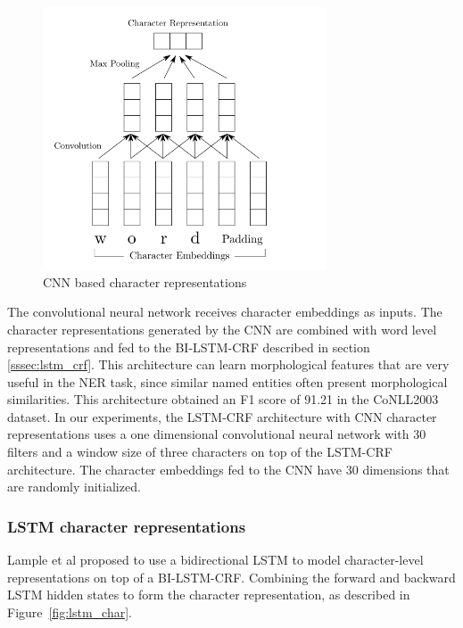 \documentclass{nle}
\begin{document}
\begin{figure}[h]
  \centering
	  \includegraphics[width=0.75\textwidth]{pics/cnn}
  \caption{CNN based character representations}
  \label{fig:cnn}
\end{figure}

The convolutional neural network receives character embeddings as inputs. The character 
representations generated by the CNN are combined with word level representations 
and fed to the BI-LSTM-CRF described in section \ref{sssec:lstm_crf}.
This architecture can learn morphological features that are very
useful in the NER task, since similar named entities often present morphological similarities. 
This architecture obtained an F1 score of 91.21 in the CoNLL2003 dataset. In our experiments, 
the LSTM-CRF architecture with CNN character representations uses a one dimensional convolutional 
neural network with 30 filters and a window size of three characters on top of the LSTM-CRF 
architecture. The character embeddings fed to the CNN have 30 dimensions that are randomly 
initialized.

\subsubsection{LSTM character representations}

Lample et al \cite{Lample2016} proposed to use a bidirectional LSTM to model character-level 
representations on top of a BI-LSTM-CRF. Combining the forward and backward LSTM hidden states 
to form the character representation, as described in Figure~\ref{fig:lstm_char}. 
\end{document}
